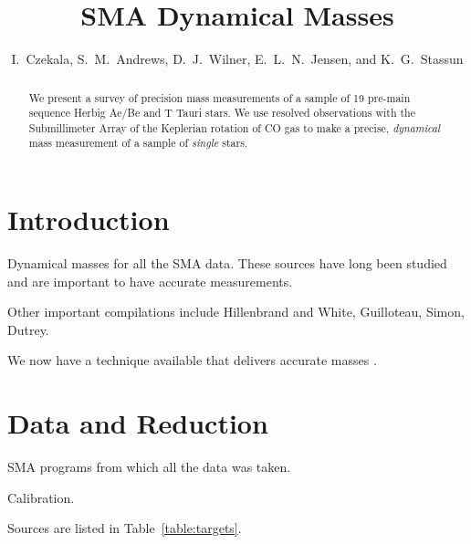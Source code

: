 \documentclass[twocolumn]{aastex6}
\begin{document}
\title{SMA Dynamical Masses}
\author{I.~Czekala, S.~M.~Andrews, D.~J.~Wilner, E.~L.~N.~Jensen, and K.~G.~Stassun}


\begin{abstract}
We present a survey of precision mass measurements of a sample of 19 pre-main sequence Herbig Ae/Be and T Tauri stars. We use resolved observations with the Submillimeter Array of the Keplerian rotation of CO gas to make a precise, \emph{dynamical} mass measurement of a sample of \emph{single} stars.
\end{abstract}


\section{Introduction}

Dynamical masses for all the SMA data. These sources have long been studied and are important to have accurate measurements.

Other important compilations include Hillenbrand and White, Guilloteau, Simon, Dutrey.

We now have a technique available that delivers accurate masses \citep{rosenfeld12b, czekala15a, czekala16}.

\section{Data and Reduction}

SMA programs from which all the data was taken.

Calibration.

Sources are listed in Table~\ref{table:targets}.
\end{document}
